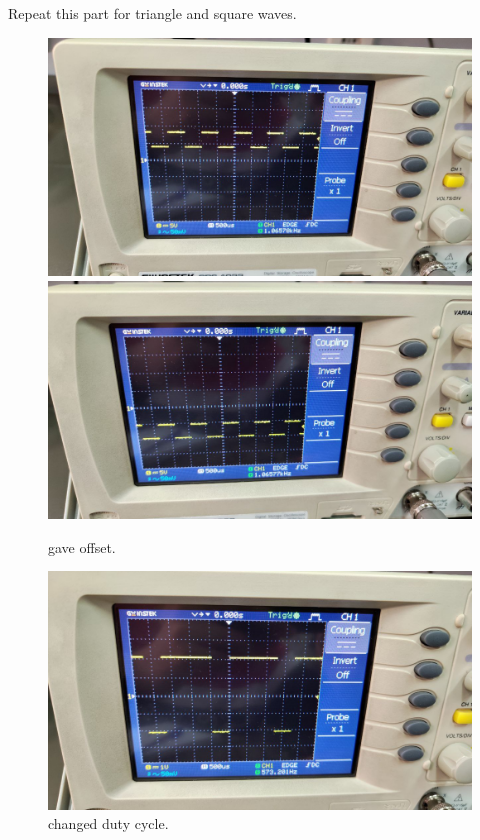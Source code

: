 \documentclass[11pt]{article}
\newcommand{\PicScale}{0.2}
\begin{document}
\begin{question}
\begin{subquestion}{Repeat this part for triangle and square waves.}
{    \begin{figure}[H]
        \begin{center}
            \includegraphics[scale=0.1]{Fig/16.jpeg}
            \includegraphics[scale=0.1]{Fig/17.jpeg}
            \caption{gave offset.}
        \end{center}
    \end{figure}

    \begin{figure}[H]
        \begin{center}
            \includegraphics[scale=\PicScale]{Fig/18.jpeg}
            \caption{changed duty cycle.}
        \end{center}
    \end{figure}
}
\end{subquestion}

\end{question}
\end{document}
